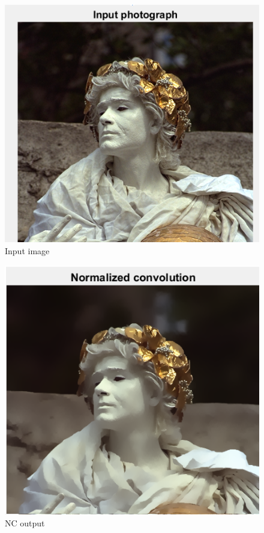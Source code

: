 \documentclass[conference]{IEEEtran}
\begin{document}
\begin{figure}
 	\includegraphics[width = \linewidth]{input_image.png}
 	\caption{Input image}
 \end{figure}
 
 \begin{figure}
 	\includegraphics[width = \linewidth]{NC_output.png}
 	\caption{NC output}
 \end{figure}
 
\end{document}
